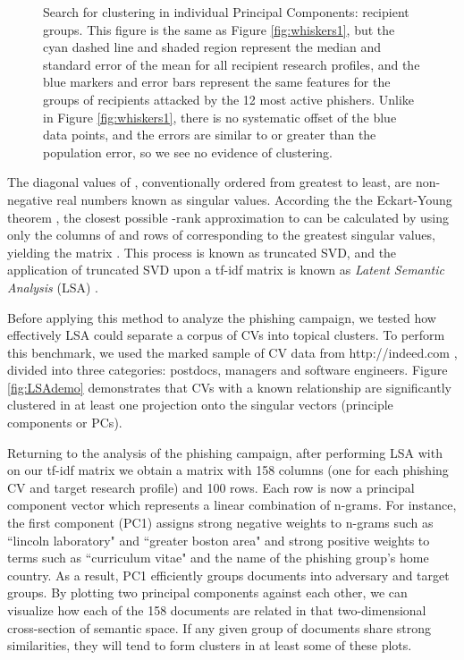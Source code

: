 \documentclass[conference]{IEEEtran}
\begin{document}
\begin{figure*}
\centering
{}
\caption{Search for clustering in individual Principal Components: recipient groups.  This figure is the same as Figure \ref{fig:whiskers1}, but the cyan dashed line and shaded region represent the median and standard error of the mean for all recipient research profiles, and the blue markers and error bars represent the same features for the groups of recipients attacked by the 12 most active phishers.  Unlike in Figure \ref{fig:whiskers1}, there is no systematic offset of the blue data points, and the errors are similar to or greater than the population error, so we see no evidence of clustering.}
\label{fig:whiskers2}
\end{figure*}

The diagonal values of , 
conventionally ordered from greatest to least, are non-negative real numbers known as singular values.  According the the Eckart-Young theorem 
\cite{salton1975vector}, the closest possible -rank approximation to  can be calculated by using only the  columns of  and  rows of  corresponding to the  greatest singular values, yielding the matrix .  This process is known as truncated SVD, and the application of truncated SVD upon a tf-idf matrix is known as \emph{Latent Semantic Analysis} (LSA) 
\cite{deerwester1990indexing}.

Before applying this method to analyze the phishing campaign, we tested how effectively LSA could separate a corpus of CVs into topical clusters. 
To perform this benchmark, we
used the marked sample of CV data from http://indeed.com \cite{indeed}, divided into three categories: postdocs, 
managers and software engineers.  Figure \ref{fig:LSAdemo} demonstrates that 
CVs with a known relationship are significantly clustered in at least one projection onto the singular vectors (principle components or PCs).

Returning to the analysis of the phishing campaign, after performing LSA with  on our tf-idf matrix we obtain a matrix with 158 columns (one for each phishing CV and target research profile) and 100 
rows.  Each row is now a principal component vector which represents a linear combination of n-grams.  For instance, the first component (PC1) assigns strong negative weights to n-grams such as ``lincoln 
laboratory" and ``greater boston area" and strong positive weights to terms such as ``curriculum vitae" and the name of the phishing group's home country.  As a result, PC1 efficiently groups documents into 
adversary and target groups.  By plotting two principal components against each other, we can visualize how each of the 158 documents are related in that two-dimensional cross-section of semantic space.  If 
any given group of documents share strong similarities, they will tend to form clusters in at least some of these plots.
\end{document}

